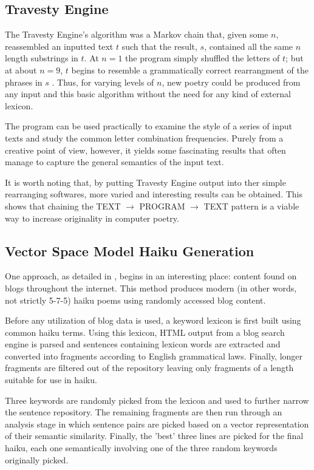 \documentclass[10pt]{article}
\begin{document}
\subsection{Travesty Engine}
The Travesty Engine's algorithm was a Markov chain that, given some $n$,
reassembled an inputted text $t$ such that the result, $s$, contained all the
same $n$ length substrings in $t$. At $n = 1$ the program simply shuffled the
letters of $t$; but at about $n = 9$, $t$ begins to resemble a grammatically
correct rearrangment of the phrases in $s$ \cite{Hart96}. Thus, for varying
levels of $n$, new poetry could be produced from any input and this basic
algorithm without the need for any kind of external lexicon.

The program can be used practically to examine the style of a series of input
texts and study the common letter combination frequencies. Purely from a
creative point of view, however, it yields some fascinating results that often
manage to capture the general semantics of the input text.

It is worth noting that, by putting Travesty Engine output into ther simple
rearranging softwares, more varied and interesting results can be
obtained. This shows that chaining the TEXT $\rightarrow$ PROGRAM $\rightarrow$
TEXT pattern is a viable way to increase originality in computer poetry.

\subsection{Vector Space Model Haiku Generation}
One approach, as detailed in \cite{Wong08}, begins in an interesting place:
content found on blogs throughout the internet. This method produces modern (in
other words, not strictly 5-7-5) haiku poems using randomly accessed blog
content. 

Before any utilization of blog data is used, a keyword lexicon is first built
using common haiku terms. Using this lexicon, HTML output from a blog search
engine is parsed and sentences containing lexicon words are extracted and
converted into fragments according to English grammatical laws. Finally, longer
fragments are filtered out of the repository leaving only fragments of a length
suitable for use in haiku.

Three keywords are randomly picked from the lexicon and used to further narrow
the sentence repository. The remaining fragments are then run through an
analysis stage in which sentence pairs are picked based on a vector
representation of their semantic similarity. Finally, the 'best' three lines
are picked for the final haiku, each one semantically involving one of the
three random keywords originally picked.
\end{document}
